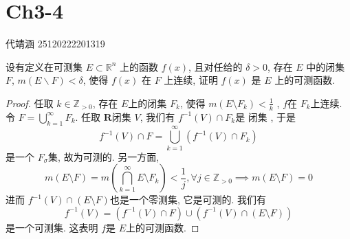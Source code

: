 \documentclass[../main.tex]{subfiles}
\begin{document}
\ifSubfilesClassLoaded{

    
    \setcounter{chapter}{2}
}{}

\chapter{ Ch3-4 }
 代靖涵 25120222201319

\begin{exercise}{}{}
    设有定义在可测集 $E \subset \mathbb{R}^n$ 上的函数 $f(x)$, 且对任给的 $\delta > 0$, 存在 $E$ 中的闭集 $F$, $m(E \backslash F) < \delta$, 使得 $f(x)$ 在 $F$ 上连续, 证明 $f(x)$ 是 $E$ 上的可测函数.
\end{exercise}
\begin{proof}
     任取 \(  k \in \mathbb{Z} _{> 0}  \), 存在 \(  E  \)上的闭集 \(  F_{k}  \), 使得 \(  m\left( E\setminus F_{k} \right)< \frac{1 }{k }    \)    , \(  f  \)在 \(  F_{k}  \)上连续. 令 \(  F= \bigcup _{k= 1}^{\infty} F_{k}\). 任取 \(  \mathbf{R}  \)闭集 \(  V  \),     我们有 \(  f^{-1} \left( V \right)\cap F_{k}   \)是 闭集  ,  于是 \[
     f^{-1} \left( V \right)\cap F= \bigcup _{k= 1}^{\infty}\left( f^{-1} \left( V \right)\cap F_{k}  \right)
     \]是一个 \(  F_{ \sigma }  \)集, 故为可测的. 另一方面,  \[
     m\left( E\setminus F \right)= m\left( \bigcap _{k= 1}^{\infty}E\setminus F_{k} \right)< \frac{1 }{j}, \forall j\in \mathbb{Z} _{> 0}\implies  m\left( E\setminus F \right)= 0    
     \] 进而 \(  f^{-1} \left( V \right)\cap \left( E\setminus F \right)    \)也是一个零测集, 它是可测的. 我们有 \[
     f^{-1} \left( V \right)= \left( f^{-1} \left( V \right)\cap F  \right)\cup \left( f^{-1} \left( V \right)\cap \left( E\setminus F \right)   \right)   
     \] 是一个可测集. 这表明 \(  f  \)是 \(  E  \)上的可测函数.  
\end{proof}
\end{document}
